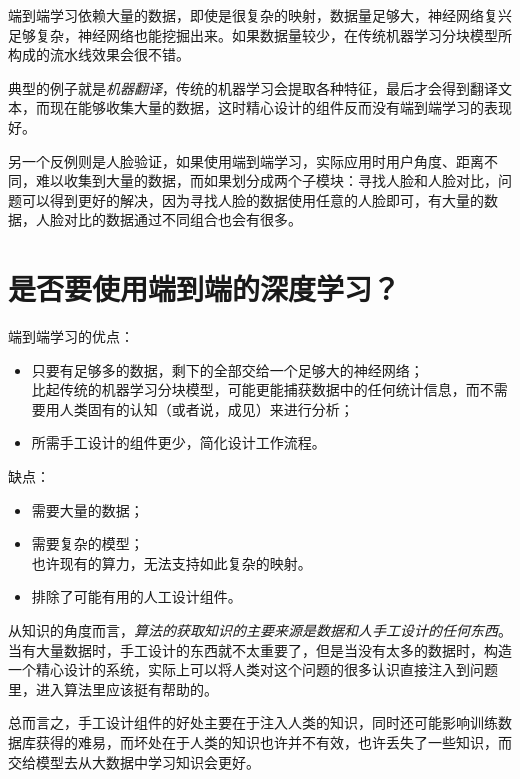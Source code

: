 \documentclass[../../main.tex]{subfiles}
\begin{document}
端到端学习依赖大量的数据，即使是很复杂的映射，数据量足够大，神经网络复兴足够复杂，神经网络也能挖掘出来。如果数据量较少，在传统机器学习分块模型所构成的流水线效果会很不错。

典型的例子就是\textit{机器翻译}，传统的机器学习会提取各种特征，最后才会得到翻译文本，而现在能够收集大量的数据，这时精心设计的组件反而没有端到端学习的表现好。

另一个反例则是人脸验证，如果使用端到端学习，实际应用时用户角度、距离不同，难以收集到大量的数据，而如果划分成两个子模块：寻找人脸和人脸对比，问题可以得到更好的解决，因为寻找人脸的数据使用任意的人脸即可，有大量的数据，人脸对比的数据通过不同组合也会有很多。

\section{是否要使用端到端的深度学习？}
\noindent 端到端学习的优点：
\begin{itemize}
    \item 只要有足够多的数据，剩下的全部交给一个足够大的神经网络；\\比起传统的机器学习分块模型，可能更能捕获数据中的任何统计信息，而不需要用人类固有的认知（或者说，成见）来进行分析；
    \item 所需手工设计的组件更少，简化设计工作流程。
\end{itemize}
缺点：
\begin{itemize}
    \item 需要大量的数据；
    \item 需要复杂的模型；\\也许现有的算力，无法支持如此复杂的映射。
    \item 排除了可能有用的人工设计组件。
\end{itemize}

从知识的角度而言，\textit{算法的获取知识的主要来源是数据和人手工设计的任何东西}。当有大量数据时，手工设计的东西就不太重要了，但是当没有太多的数据时，构造一个精心设计的系统，实际上可以将人类对这个问题的很多认识直接注入到问题里，进入算法里应该挺有帮助的。

总而言之，手工设计组件的好处主要在于注入人类的知识，同时还可能影响训练数据库获得的难易，而坏处在于人类的知识也许并不有效，也许丢失了一些知识，而交给模型去从大数据中学习知识会更好。
\end{document}
